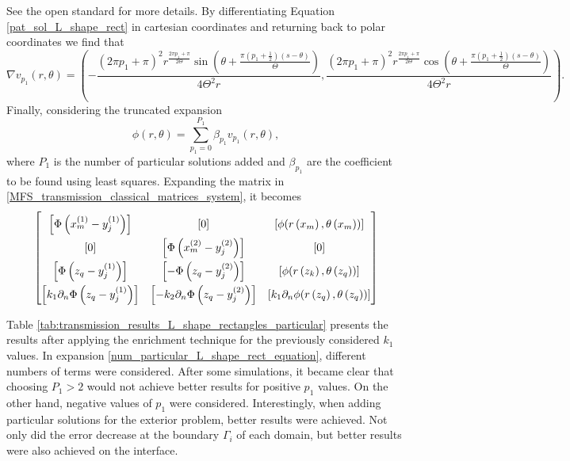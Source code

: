 See the open standard \cite{jones2010wg14} for more details.
By differentiating Equation \eqref{pat_sol_L_shape_rect} in cartesian coordinates and returning back to polar coordinates we find that
\begin{equation*}
    \nabla v_{p_1}(r, \theta) = \left(-\frac{(2 \pi  {p_1}+\pi )^2 r^{\frac{2 \pi  {p_1}+\pi }{2 \Theta }} \sin \left(\theta +\frac{\pi  \left(p_1+\frac{1}{2}\right) (s-\theta )}{\Theta }\right)}{4 \Theta ^2 r},\frac{(2 \pi  p_1+\pi )^2 r^{\frac{2 \pi  p_1+\pi }{2 \Theta }} \cos \left(\theta +\frac{\pi  \left(p_1+\frac{1}{2}\right) (s-\theta )}{\Theta }\right)}{4 \Theta ^2 r}\right).
\end{equation*}
Finally, considering the truncated expansion
\begin{equation}\label{num_particular_L_shape_rect_equation}
    \phi(r,\theta)=\sum_{p_1=0}^{P_1} \beta_{p_1} v_{p_1}(r, \theta),
\end{equation}
where \(P_1\) is the number of particular solutions added and \(\beta_{p_1}\) are the coefficient to be found using least squares. Expanding the matrix in \eqref{MFS_transmission_classical_matrices_system}, it becomes
\begin{equation}\label{transmission_mat_L_rect_exp}
    \renewcommand{\arraystretch}{1.75} %
    \begin{bmatrix}
        \left[\Phi\left(x^{(1)}_{m}-y_j^{(1)}\right)\right] & [0] & \left[\phi(r\left(x_m\right),\theta\left(x_m\right))\right]\\
        [0] & \left[\Phi\left(x^{(2)}_{m}-y_j^{(2)}\right)\right] & \left[0\right]\\
        \left[\Phi\left(z_q-y_j^{(1)}\right)\right] & \left[-\Phi\left(z_q-y_j^{(2)}\right)\right] & \left[\phi(r\left(z_k\right),\theta\left(z_q\right))\right]\\
        \left[k_1\partial_n \Phi\left(z_q-y_j^{(1)}\right)\right] & \left[-k_2 \partial_n \Phi\left(z_q-y_j^{(2)}\right)\right] & \left[k_1 \partial_n\phi(r\left(z_q\right),\theta\left(z_q\right))\right]
    \end{bmatrix}
\end{equation}

Table \ref{tab:transmission_results_L_shape_rectangles_particular} presents the results after applying the enrichment technique for the previously considered \(k_1\) values. In expansion \eqref{num_particular_L_shape_rect_equation}, different numbers of terms were considered. After some simulations, it became clear that choosing \(P_1 > 2\) would not achieve better results for positive \(p_1\) values. On the other hand, negative values of \(p_1\) were considered. Interestingly, when adding particular solutions for the exterior problem, better results were achieved. Not only did the error decrease at the boundary \(\Gamma_i\) of each domain, but better results were also achieved on the interface.

